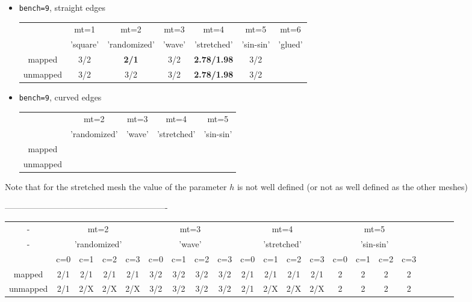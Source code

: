 \begin{itemize}
\item {\tt bench=9}, straight edges

\begin{tabular}{c|cccccc}
\hline
& mt=1     &  mt=2        &  mt=3  &  mt=4       & mt=5  & mt=6\\
& 'square' & 'randomized' & 'wave' & 'stretched' & 'sin-sin' & 'glued'\\
\hline
mapped   & 3/2 & {\bf 2/1} &3/2 & {\bf 2.78/1.98}  &3/2 \\
unmapped & 3/2 &3/2 &3/2 & {\bf 2.78/1.98} &3/2 \\
\hline
\end{tabular}

\item {\tt bench=9}, curved edges

\begin{tabular}{c|cccc}
\hline
&  mt=2        &  mt=3  &  mt=4       & mt=5 \\
& 'randomized' & 'wave' & 'stretched' & 'sin-sin' \\
\hline
mapped   & \\ 
unmapped &  \\
\hline
\end{tabular}

\end{itemize}

Note that for the stretched mesh the value of the parameter $h$ is not well defined (or
not as well defined as the other meshes)

----------------------------------------------------------

\begin{small}
\begin{tabular}{c|cccc|cccc|cccc|cccc|cccc|}
\hline
-&
\multicolumn{4}{c|}{mt=2}&
\multicolumn{4}{c|}{mt=3}&
\multicolumn{4}{c|}{mt=4}&
\multicolumn{4}{c|}{mt=5}\\
-&
\multicolumn{4}{c|}{'randomized'}&
\multicolumn{4}{c|}{'wave'}&
\multicolumn{4}{c|}{'stretched'} & 
\multicolumn{4}{c|}{'sin-sin'} \\
\hline
& c=0 & c=1 & c=2 & c=3
& c=0 & c=1 & c=2 & c=3
& c=0 & c=1 & c=2 & c=3
& c=0 & c=1 & c=2 & c=3 \\
\hline
mapped   & 2/1&2/1&2/1&2/1 &3/2&3/2&3/2&3/2  &2/1&2/1&2/1&2/1 &2&2&2&2  \\
unmapped & 2/1&2/X&2/X&2/X &3/2&3/2&3/2&3/2  &2/1&2/X&2/X&2/X &2&2&2&2  \\
\hline
\end{tabular}
\end{small}




